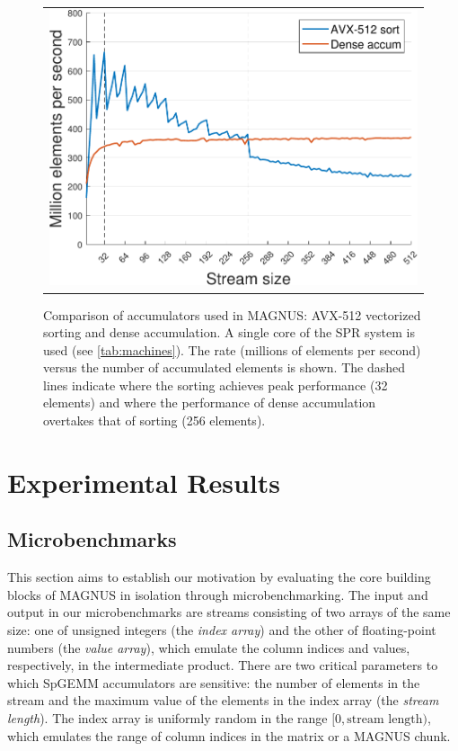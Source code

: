 \begin{figure}[t]
\centering
\begin{tabular}{c}
\includegraphics[width=\figwidth]{figs/sort_benchmark_sortSize.pdf}
\end{tabular}
\caption{Comparison of accumulators used in MAGNUS: AVX-512 vectorized sorting and dense accumulation.
A single core of the SPR system is used (see \autoref{tab:machines}).
The rate (millions of elements per second) versus the number of accumulated elements is shown.
The dashed lines indicate where the sorting achieves peak performance (32 elements) and where the performance of dense accumulation overtakes that of sorting (256 elements).}
\label{fig:sort_benchmark}
\end{figure}


\section{Experimental Results}\label{sec:results}

\subsection{Microbenchmarks}\label{sec:microbench}
This section aims to establish our motivation by evaluating the core building blocks of MAGNUS in isolation through microbenchmarking.
The input and output in our microbenchmarks are streams consisting of two arrays of the same size: one of unsigned integers (the \textit{index array}) and the other of floating-point numbers (the \textit{value array}), which emulate the column indices and values, respectively, in the intermediate product.
There are two critical parameters to which SpGEMM accumulators are sensitive: the number of elements in the stream and the maximum value of the elements in the index array (the \textit{stream length}).
The index array is uniformly random in the range $[0, \text{stream length})$, which emulates the range of column indices in the matrix or a MAGNUS chunk.

